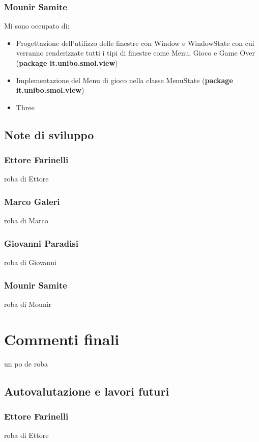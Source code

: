 \documentclass[a4paper,12pt]{report}
\begin{document}
\subsection*{Mounir Samite}
Mi sono occupato di:
\begin{itemize}
    \item Progettazione dell'utilizzo delle finestre con Window e WindowState con cui verranno renderizzate tutti i tipi di finestre come Menu, Gioco e Game Over (\textbf{package it.unibo.smol.view})
    \item Implementazione del Menu di gioco nella classe MenuState (\textbf{package it.unibo.smol.view})
    \item Three
\end{itemize}

\section{Note di sviluppo}

\subsection*{Ettore Farinelli}
roba di Ettore
\subsection*{Marco Galeri}
roba di Marco
\subsection*{Giovanni Paradisi}
roba di Giovanni
\subsection*{Mounir Samite}
roba di Mounir

\chapter{Commenti finali}

un po de roba

\section{Autovalutazione e lavori futuri}
\subsection*{Ettore Farinelli}
roba di Ettore
\end{document}

